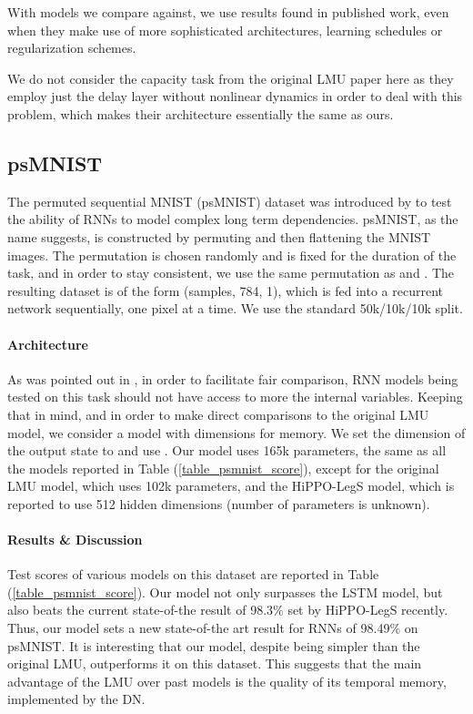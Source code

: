 \documentclass{article}
\begin{document}
With models we compare against, we use results found in published work, even when they make use of more sophisticated architectures, learning schedules or regularization schemes.

We do not consider the capacity task from the original LMU paper here as they employ just the delay layer without nonlinear dynamics in order to deal with this problem, which makes their architecture essentially the same as ours.

\subsection{psMNIST}

 The permuted sequential MNIST (psMNIST) dataset was introduced by \citet{le2015simple} to test the ability of RNNs to model complex long term dependencies. psMNIST, as the name suggests, is constructed by permuting and then flattening the  MNIST images. The permutation is chosen randomly and is fixed for the duration of the task, and in order to stay consistent, we use the same permutation as \citet{chandar2019towards} and \citet{voelker2019legendre}. The resulting dataset is of the form (samples, 784, 1), which is fed into a recurrent network sequentially, one pixel at a time. We use the standard 50k/10k/10k split. 

\paragraph{Architecture} As was pointed out in \citet{voelker2019legendre}, in order to facilitate fair comparison, RNN models being tested on this task should not have access to more the  internal variables. Keeping that in mind, and in order to make direct comparisons to the original LMU model, we consider a model with  dimensions for memory. We set the dimension of the output state to  and use . Our model uses 165k parameters, the same as all the models reported in Table (\ref{table_psmnist_score}), except for the original LMU model, which uses 102k parameters, and the HiPPO-LegS model, which is reported to use 512 hidden dimensions (number of parameters is unknown).


\paragraph{Results \& Discussion} Test scores of various models on this dataset are reported in Table (\ref{table_psmnist_score}). Our model not only surpasses the LSTM model, but also beats the current state-of-the result of 98.3\% set by HiPPO-LegS \citep{gu2020hippo} recently. Thus, our model sets a new state-of-the art result for RNNs of 98.49\% on psMNIST. It is interesting that our model,
despite being simpler than the original LMU, outperforms it on this dataset. This suggests that the main advantage of the LMU over past models is the quality of its temporal memory, implemented by the DN. 
\end{document}
